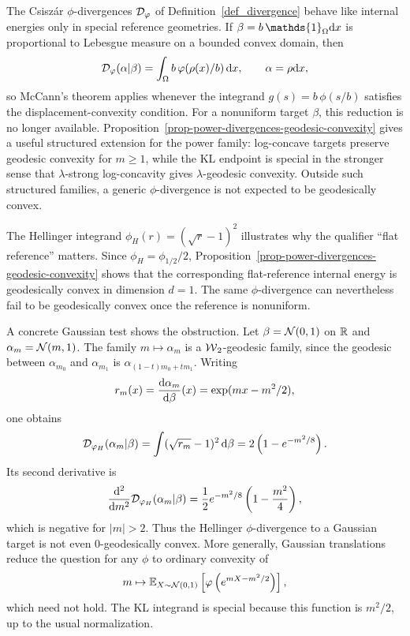 \begin{rem}\label{rem-phi-divergence-geodesic-convexity}
	The Csisz\'ar \(\phi\)-divergences \(\mathcal{D}_\varphi\) of Definition~\ref{def_divergence} behave like internal energies only in special reference geometries. If \(\beta=b\,\mathds{1}_{\Omega}\d x\) is proportional to Lebesgue measure on a bounded convex domain, then
	\[
		\mathcal{D}_\varphi(\alpha|\beta)
		=
		\int_{\Omega} b\,\varphi(\rho(x)/b)\,\mathrm{d} x,
		\qquad \alpha=\rho\mathrm{d} x,
	\]
	so McCann's theorem applies whenever the integrand \(g(s)=b\,\phi(s/b)\) satisfies the displacement-convexity condition. For a nonuniform target \(\beta\), this reduction is no longer available. Proposition~\ref{prop-power-divergences-geodesic-convexity} gives a useful structured extension for the power family: log-concave targets preserve geodesic convexity for \(m\geq1\), while the KL endpoint is special in the stronger sense that \(\lambda\)-strong log-concavity gives \(\lambda\)-geodesic convexity. Outside such structured families, a generic \(\phi\)-divergence is not expected to be geodesically convex.

	The Hellinger integrand \(\phi_H(r)=(\sqrt r-1)^2\) illustrates why the qualifier ``flat reference'' matters. Since \(\phi_H=\phi_{1/2}/2\), Proposition~\ref{prop-power-divergences-geodesic-convexity} shows that the corresponding flat-reference internal energy is geodesically convex in dimension \(d=1\). The same \(\phi\)-divergence can nevertheless fail to be geodesically convex once the reference is nonuniform.

	A concrete Gaussian test shows the obstruction. Let \(\beta=\mathcal{N}(0,1)\) on \(\mathbb{R}\) and \(\alpha_m=\mathcal{N}(m,1)\). The family \(m\mapsto\alpha_m\) is a \(\operatorname{\mathcal{W}}_2\)-geodesic family, since the geodesic between \(\alpha_{m_0}\) and \(\alpha_{m_1}\) is \(\alpha_{(1-t)m_0+t m_1}\). Writing
	\[
		r_m(x)=\frac{\mathrm{d}\alpha_m}{\mathrm{d}\beta}(x)=\exp(mx-m^2/2),
	\]
	one obtains
	\[
		\mathcal{D}_{\varphi_H}(\alpha_m|\beta)
		=
		\int(\sqrt{r_m}-1)^2\,\mathrm{d}\beta
		=
		2\left(1-e^{-m^2/8}\right).
	\]
	Its second derivative is
	\[
		\frac{\mathrm{d}^2}{\mathrm{d} m^2}\mathcal{D}_{\varphi_H}(\alpha_m|\beta)
		=
		\frac12 e^{-m^2/8}\left(1-\frac{m^2}{4}\right),
	\]
	which is negative for \(|m|>2\). Thus the Hellinger \(\phi\)-divergence to a Gaussian target is not even \(0\)-geodesically convex. More generally, Gaussian translations reduce the question for any \(\phi\) to ordinary convexity of
	\[
		m\mapsto
		\mathbb{E}_{X\sim\mathcal{N}(0,1)}
		\left[\varphi\left(e^{mX-m^2/2}\right)\right],
	\]
	which need not hold. The KL integrand is special because this function is \(m^2/2\), up to the usual normalization.
\end{rem}

